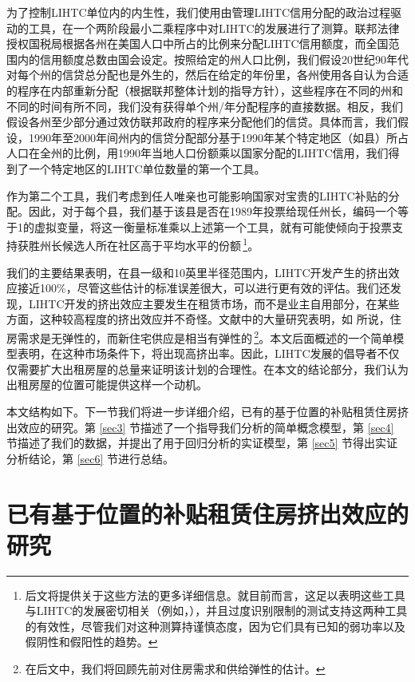 \documentclass[lang=cn,11pt,a4paper]{paper}
\begin{document}
为了控制LIHTC单位内的内生性，我们使用由管理LIHTC信用分配的政治过程驱动的工具，在一个两阶段最小二乘程序中对LIHTC的发展进行了测算。联邦法律授权国税局根据各州在美国人口中所占的比例来分配LIHTC信用额度，而全国范围内的信用额度总数由国会设定。按照给定的州人口比例，我们假设20世纪90年代对每个州的信贷总分配也是外生的，然后在给定的年份里，各州使用各自认为合适的程序在内部重新分配（根据联邦整体计划的指导方针），这些程序在不同的州和不同的时间有所不同，我们没有获得单个州/年分配程序的直接数据。相反，我们假设各州至少部分通过效仿联邦政府的程序来分配他们的信贷。具体而言，我们假设，1990年至2000年间州内的信贷分配部分基于1990年某个特定地区（如县）所占人口在全州的比例，用1990年当地人口份额乘以国家分配的LIHTC信用，我们得到了一个特定地区的LIHTC单位数量的第一个工具。

作为第二个工具，我们考虑到任人唯亲也可能影响国家对宝贵的LIHTC补贴的分配。因此，对于每个县，我们基于该县是否在1989年投票给现任州长，编码一个等于1的虚拟变量，将这一衡量标准乘以上述第一个工具，就有可能使倾向于投票支持获胜州长候选人所在社区高于平均水平的份额\,\footnote{后文将提供关于这些方法的更多详细信息。就目前而言，这足以表明这些工具与LIHTC的发展密切相关（例如，\citep{Stock200580,Murray2006111}），并且过度识别限制的测试支持这两种工具的有效性，尽管我们对这种测算持谨慎态度，因为它们具有已知的弱功率以及假阴性和假阳性的趋势。}。

我们的主要结果表明，在县一级和10英里半径范围内，LIHTC开发产生的挤出效应接近100\%，尽管这些估计的标准误差很大，可以进行更有效的评估。我们还发现，LIHTC开发的挤出效应主要发生在租赁市场，而不是业主自用部分，在某些方面，这种较高程度的挤出效应并不奇怪。文献中的大量研究表明，如 \cite{Hanushek1980449} 所说，住房需求是无弹性的，而新住宅供应是相当有弹性的\,\footnote{在后文中，我们将回顾先前对住房需求和供给弹性的估计。}。本文后面概述的一个简单模型表明，在这种市场条件下，将出现高挤出率。因此，LIHTC发展的倡导者不仅仅需要扩大出租房屋的总量来证明该计划的合理性。在本文的结论部分，我们认为出租房屋的位置可能提供这样一个动机。

本文结构如下。下一节我们将进一步详细介绍，已有的基于位置的补贴租赁住房挤出效应的研究。第 \ref{sec3} 节描述了一个指导我们分析的简单概念模型，第 \ref{sec4} 节描述了我们的数据，并提出了用于回归分析的实证模型，第 \ref{sec5} 节得出实证分析结论，第 \ref{sec6} 节进行总结。

\section{已有基于位置的补贴租赁住房挤出效应的研究}
\end{document}
